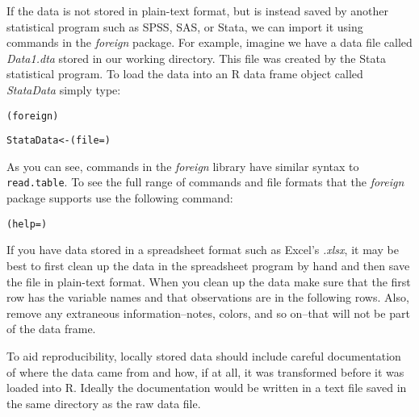If the data is not stored in plain-text format, but is instead saved by another statistical program such as SPSS, SAS, or Stata, we can import it using commands in the \emph{foreign} package. For example, imagine we have a data file called \emph{Data1.dta} stored in our working directory. This file was created by the Stata statistical program. To load the data into an R data frame object called \emph{StataData} simply type:

\begin{knitrout}
\color{fgcolor}\begin{kframe}
\begin{alltt}
(foreign)

StataData <- (file = )
\end{alltt}
\end{kframe}
\end{knitrout}


As you can see, commands in the \emph{foreign} library have similar syntax to \texttt{read.table}. To see the full range of commands and file formats that the \emph{foreign} package supports use the following command:

\begin{knitrout}
\color{fgcolor}\begin{kframe}
\begin{alltt}
(help = )
\end{alltt}
\end{kframe}
\end{knitrout}


If you have data stored in a spreadsheet format such as Excel's \emph{.xlsx}, it may be best to first clean up the data in the spreadsheet program by hand and then save the file in plain-text format. When you clean up the data make sure that the first row has the variable names and that observations are in the following rows. Also, remove any extraneous information--notes, colors, and so on--that will not be part of the data frame.

To aid reproducibility, locally stored data should include careful documentation of where the data came from and how, if at all, it was transformed before it was loaded into R. Ideally the documentation would be written in a text file saved in the same directory as the raw data file. 

